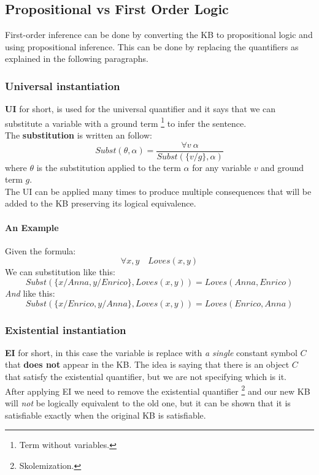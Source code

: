 \documentclass[10pt,a4paper]{article}
\begin{document}
\subsection{Propositional vs First Order Logic}
\label{subsec:prop_vs_fol}


First-order inference can be done by converting the KB to propositional logic and using propositional inference. This can be done by replacing the quantifiers as explained in the following paragraphs.

\subsubsection{Universal instantiation}
\label{subsubsec:UI}

\textbf{UI} for short, is used for the universal quantifier and it says that we can substitute a variable with a ground term \footnote{Term without variables.} to infer the sentence.\\
The \textbf{substitution} is written an follow:
\[Subst(\theta,\alpha)=\frac{\forall v\ \alpha}{Subst(\lbrace v/g\rbrace,\alpha)}\]
where $\theta$ is the substitution applied to the term $\alpha$ for any variable $v$ and ground term $g$. \\
The UI can be applied many times to produce multiple consequences that will be added to the KB  preserving its logical equivalence.

\paragraph{An Example}
Given the formula:
\[\forall x,y\quad Loves(x,y)\]
We can substitution like this:
\[Subst(\lbrace x/Anna,y/Enrico \rbrace,Loves(x,y))=Loves(Anna,Enrico)\]
\textit{And} like this:
\[Subst(\lbrace x/Enrico,y/Anna \rbrace,Loves(x,y))=Loves(Enrico,Anna)\]

\subsubsection{Existential instantiation}
\label{subsubsec:EI}
\textbf{EI} for short, in this case the variable is replace with \textit{a single} constant symbol $C$ that \textbf{does not} appear in the KB. The idea is saying that there is an object $C$ that satisfy the existential quantifier, but we are not specifying which is it.\\
After applying EI we need to remove the existential quantifier \footnote{Skolemization.} and our new KB will \textit{not} be logically equivalent to the old one, but it can be shown that it is satisfiable exactly when the original KB is satisfiable.
\end{document}
